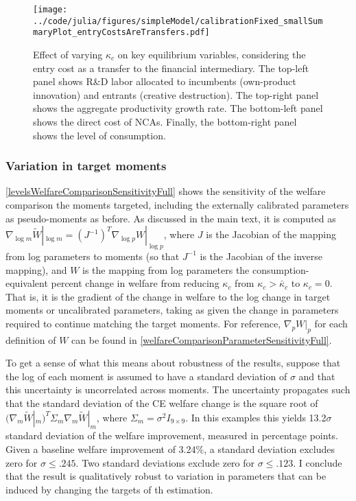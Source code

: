 \documentclass[11pt,english]{article}
\theoremstyle{definition}
\begin{document}
\begin{figure}[]
	\centering
	\texttt{[image: ../code/julia/figures/simpleModel/calibrationFixed\_smallSummaryPlot\_entryCostsAreTransfers.pdf]}
	\caption{Effect of varying $\kappa_c$ on key equilibrium variables, considering the entry cost as a transfer to the financial intermediary. The top-left panel shows R\&D labor allocated to incumbents (own-product innovation) and entrants (creative destruction). The top-right panel shows the aggregate productivity growth rate. The bottom-left panel shows the direct cost of NCAs. Finally, the bottom-right panel shows the level of consumption.}
	\label{calibration_smallSummaryPlot_entryCostsAsTransfers}
\end{figure}


\subsubsection{Variation in target moments}

\autoref{levelsWelfareComparisonSensitivityFull} shows the sensitivity of the welfare comparison the moments targeted, including the externally calibrated parameters as pseudo-moments as before. As discussed in the main text, it is computed as $\nabla_{\log m} \tilde{W}|_{\log m} = (J^{-1})^T \nabla_{\log p} W|_{\log p}$, where $J$ is the Jacobian of the mapping from log parameters to moments (so that $J^{-1}$ is the Jacobian of the inverse mapping), and $W$ is the mapping from log parameters the consumption-equivalent percent change in welfare from reducing $\kappa_c$ from $\kappa_c > \bar{\kappa}_c$ to $\kappa_c = 0$. That is, it is the gradient of the change in welfare to the log change in target moments or uncalibrated parameters, taking as given the change in parameters required to continue matching the target moments. For reference, $\nabla_p W|_p$  for each definition of $W$ can be found in \autoref{welfareComparisonParameterSensitivityFull}.

To get a sense of what this means about robustness of the results, suppose that the log of each moment is assumed to have a standard deviation of $\sigma$ and that this uncertainty is uncorrelated across moments. The uncertainty propagates such that the standard deviation of the CE welfare change is the square root of $(\nabla_m \tilde{W}|_m)^T \Sigma_m \nabla_m \tilde{W}|_m$, where $\Sigma_m = \sigma^2 I_{9\times 9}$. In this examples this yields 13.2$\sigma$ standard deviation of the welfare improvement, measured in percentage points. Given a baseline welfare improvement of 3.24\%, a standard deviation excludes zero for $\sigma \le .245$. Two standard deviations exclude zero for $\sigma \le .123$. I conclude that the result is qualitatively robust to variation in parameters that can be induced by changing the targets of th estimation. 
\end{document}
